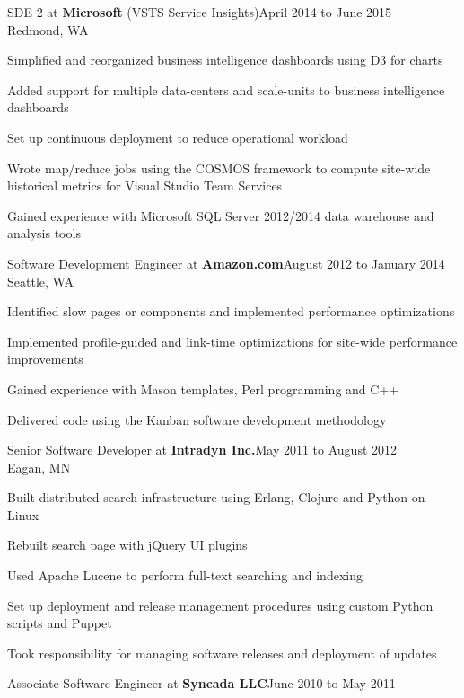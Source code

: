 \documentclass[letterpaper]{article}
\newenvironment{resume-list}
{\begin{itemize}
 \setlength{\itemsep}{0pt}
 \setlength{\parskip}{0pt}}
{\end{itemize}}
\begin{document}
\noindent SDE 2 at {\bfseries Microsoft} (VSTS Service Insights)\dotfill April 2014 to June 2015\\
Redmond, WA
\begin{resume-list}
\item Simplified and reorganized business intelligence dashboards using D3 for charts
\item Added support for multiple data-centers and scale-units to business intelligence dashboards
\item Set up continuous deployment to reduce operational workload
\item Wrote map/reduce jobs using the COSMOS framework to compute site-wide historical metrics for Visual Studio Team Services
\item Gained experience with Microsoft SQL Server 2012/2014 data warehouse and analysis tools
\end{resume-list}
\noindent Software Development Engineer at {\bfseries Amazon.com}\dotfill August 2012 to January 2014\\
Seattle, WA
\begin{resume-list}
\item Identified slow pages or components and implemented performance optimizations
\item Implemented profile-guided and link-time optimizations for site-wide performance improvements
\item Gained experience with Mason templates, Perl programming and C++
\item Delivered code using the Kanban software development methodology
\end{resume-list}
\noindent Senior Software Developer at {\bfseries Intradyn Inc.}\dotfill May 2011 to August 2012\\
Eagan, MN
\begin{resume-list}
\item Built distributed search infrastructure using Erlang, Clojure and Python on Linux
\item Rebuilt search page with jQuery UI plugins
\item Used Apache Lucene to perform full-text searching and indexing
\item Set up deployment and release management procedures using custom Python scripts and Puppet
\item Took responsibility for managing software releases and deployment of updates
\pagebreak
\end{resume-list}
\noindent Associate Software Engineer at {\bfseries Syncada LLC}\dotfill June 2010 to May 2011\\
\end{document}
